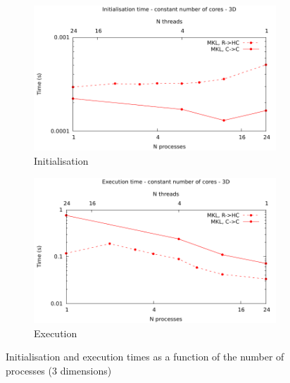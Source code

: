 \documentclass[12pt, a4paper]{article} \setlength{\textheight}{24cm}
\begin{document}
\begin{figure}[H]
  \captionsetup{width=0.8\linewidth}
  \centering
  \begin{subfigure}{.5\textwidth}
    \centering
    \includegraphics[width=.9\linewidth]{graphs/const-init-3d.pdf}
    \caption{Initialisation}
    \label{3DCONSTI}
  \end{subfigure}%
  \begin{subfigure}{.5\textwidth}
    \centering
    \includegraphics[width=.9\linewidth]{graphs/const-exec-3d.pdf}
    \caption{Execution}
    \label{3DCONSTE}
  \end{subfigure}
  \caption{Initialisation and execution times as a function of the
    number of processes (3 dimensions)}
  \label{3DCONST}
\end{figure}
\end{document}
